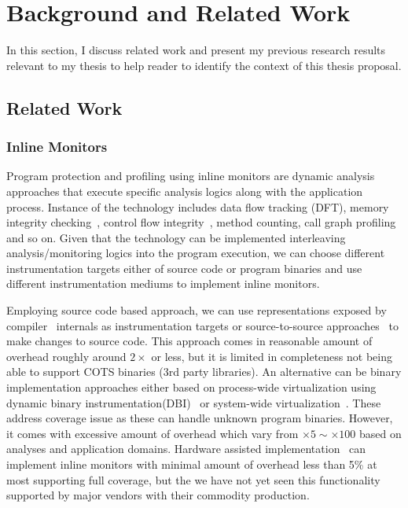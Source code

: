 \section{Background and Related Work}
\label{sec:related}

In this section, I discuss related work and present my previous research
results relevant to my thesis to help reader to identify the context of this
thesis proposal.

\subsection{Related Work}

\subsubsection{Inline Monitors}
\label{ssec:inline}

Program protection and profiling using inline monitors are dynamic analysis
approaches that execute specific analysis logics along with the application
process. Instance of the technology includes data flow tracking (DFT), memory
integrity checking~\cite{memcheck, drmemory:cgo2011}, control flow
integrity~\cite{cfi}, method counting, call graph profiling and so on.  Given
that the technology can be implemented interleaving analysis/monitoring logics
into the program execution, we can choose different instrumentation targets
either of source code or program binaries and use different instrumentation
mediums to implement inline monitors.

Employing source code based approach, we can use representations
exposed  by compiler~\cite{llvm:cgo04} internals as instrumentation targets or
source-to-source approaches~\cite{txl, cil} to make changes to source code.
This approach comes in reasonable amount of overhead roughly around $2\times$
or less, but it is limited in completeness not being able to support COTS
binaries (\ie 3rd party libraries).  An alternative can be binary
implementation approaches either based on process-wide virtualization using
dynamic binary instrumentation(DBI)~\cite{PIN, dynamoRIO, valgrind} or
system-wide virtualization~\cite{qemu,xen}. These address coverage issue as
these can handle unknown program binaries. However, it comes with excessive
amount of overhead which vary from $\times 5 \sim \times 100$ based on analyses
and application domains. Hardware assisted implementation~\cite{HARD, lba} can
implement inline monitors with minimal amount of overhead less than 5\% at most
supporting full coverage, but the we have not yet seen this functionality
supported by major vendors with their commodity production.

